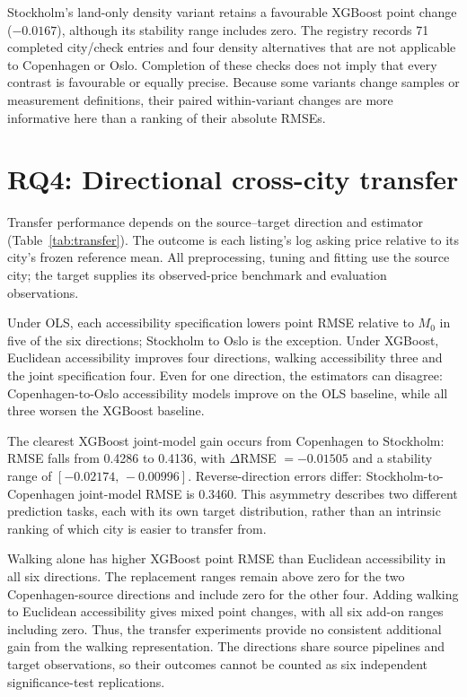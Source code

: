 \documentclass[11pt,a4paper,oneside,openany]{memoir}
\begin{document}
Stockholm's land-only density variant retains a favourable XGBoost point
change ($-0.0167$), although its stability range includes zero. The registry
records 71 completed city/check entries and four density alternatives that
are not applicable to Copenhagen or Oslo. Completion of these checks does
not imply that every contrast is favourable or equally precise. Because some
variants change samples or measurement definitions, their paired within-variant
changes are more informative here than a ranking of their absolute RMSEs.

\section{RQ4: Directional cross-city transfer}
\label{sec:rq4-results}
Transfer performance depends on the source--target direction and estimator
(Table~\ref{tab:transfer}). The outcome is each listing's log asking price
relative to its city's frozen reference mean. All preprocessing, tuning and
fitting use the source city; the target supplies its observed-price benchmark
and evaluation observations.



Under OLS, each accessibility specification lowers point RMSE relative to
$M_0$ in five of the six directions; Stockholm to Oslo is the exception.
Under XGBoost, Euclidean accessibility improves four directions, walking
accessibility three and the joint specification four. Even for one direction,
the estimators can disagree: Copenhagen-to-Oslo accessibility models improve
on the OLS baseline, while all three worsen the XGBoost baseline.

The clearest XGBoost joint-model gain occurs from Copenhagen to Stockholm:
RMSE falls from 0.4286 to 0.4136, with
$\Delta$RMSE $=-0.01505$ and a stability range of
$[-0.02174,\,-0.00996]$. Reverse-direction errors differ: Stockholm-to-Copenhagen
joint-model RMSE is 0.3460. This asymmetry describes two different prediction
tasks, each with its own target distribution, rather than an intrinsic ranking
of which city is easier to transfer from.

Walking alone has higher XGBoost point RMSE than Euclidean accessibility in
all six directions. The replacement ranges remain above zero for the two
Copenhagen-source directions and include zero for the other four. Adding
walking to Euclidean accessibility gives mixed point changes, with all six
add-on ranges including zero. Thus, the transfer experiments provide no
consistent additional gain from the walking representation. The directions
share source pipelines and target observations, so their outcomes cannot be
counted as six independent significance-test replications.
\end{document}
